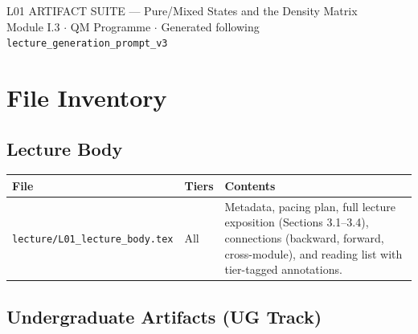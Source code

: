 \documentclass[11pt,a4paper]{article}
\begin{document}
\begin{tcolorbox}[trackheaderUG]
L01 ARTIFACT SUITE --- Pure/Mixed States and the Density Matrix\\
\normalsize Module I.3 $\cdot$ QM Programme $\cdot$
Generated following \texttt{lecture\_generation\_prompt\_v3}
\end{tcolorbox}

\bigskip

\section*{File Inventory}

\subsection*{Lecture Body}

\begin{tabularx}{\textwidth}{llX}
\toprule
\textbf{File} & \textbf{Tiers} & \textbf{Contents}\\
\midrule
\texttt{lecture/L01\_lecture\_body.tex}
& All
& Metadata, pacing plan, full lecture exposition (Sections 3.1--3.4),
  connections (backward, forward, cross-module), and reading list
  with tier-tagged annotations.\\
\bottomrule
\end{tabularx}

\subsection*{Undergraduate Artifacts (UG Track)}
\end{document}
